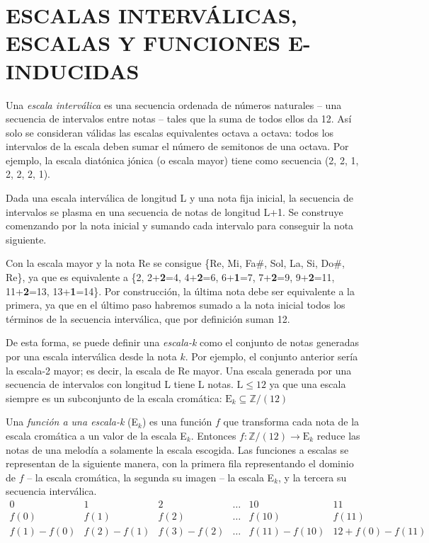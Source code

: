 	\section[E. INTERVÁLICAS, ESCALAS Y FUNCIONES E-INDUCIDAS]{ESCALAS INTERVÁLICAS, ESCALAS Y FUNCIONES E-INDUCIDAS}
	
		Una \textit{escala interválica} es una secuencia ordenada de números naturales -- una secuencia de intervalos entre notas -- tales que la suma de todos ellos da 12. Así solo se consideran válidas las escalas equivalentes octava a octava: todos los intervalos de la escala deben sumar el número de semitonos de una octava. Por ejemplo, la escala diatónica jónica (o escala mayor) tiene como secuencia (2, 2, 1, 2, 2, 2, 1).
		
		Dada una escala interválica de longitud L y una nota fija inicial, la secuencia de intervalos se plasma en una secuencia de notas de longitud L+1. Se construye comenzando por la nota inicial y sumando cada intervalo para conseguir la nota siguiente. 
		
		Con la escala mayor y la nota Re se consigue \{Re, Mi, Fa$\#$, Sol, La, Si, Do$\#$, Re\}, ya que es equivalente a \{2, 2+\textbf{2}=4, 4+\textbf{2}=6, 6+\textbf{1}=7, 7+\textbf{2}=9, 9+\textbf{2}=11, 11+\textbf{2}=13, 13+\textbf{1}=14\}. Por construcción, la última nota debe ser equivalente a la primera, ya que en el último paso habremos sumado a la nota inicial todos los términos de la secuencia interválica, que por definición suman 12.
		
		De esta forma, se puede definir una \textit{escala-k} como el conjunto de notas generadas por una escala interválica desde la nota $k$. Por ejemplo, el conjunto anterior sería la escala-2 mayor; es decir, la escala de Re mayor. Una escala generada por una secuencia de intervalos con longitud L tiene L notas. $\text{L}\leq 12$ ya que una escala siempre es un subconjunto de la escala cromática: $\text{E}_k\subseteq\mathbb{Z}/(12)$
		
		Una \textit{función a una escala-k} (E$_k$) es una función $f$ que transforma cada nota de la escala cromática a un valor de la escala E$_k$. Entonces $f : \mathbb{Z}/(12) \rightarrow \text{E}_k$ reduce las notas de una melodía a solamente la escala escogida. Las funciones a escalas se representan de la siguiente manera, con la primera fila representando el dominio de $f$ -- la escala cromática, la segunda su imagen -- la escala E$_k$, y la tercera su secuencia interválica.
		\footnotesize{
		$$\left.\begin{matrix}
		0&1&2&\ldots&10&11\\
		f(0)&f(1)&f(2)&\ldots&f(10)&f(11)\\
		f(1)-f(0)&f(2)-f(1)&f(3)-f(2)&\ldots&f(11)-f(10)&12+f(0)-f(11)
		\end{matrix}\right.$$
		}
		\small
		
